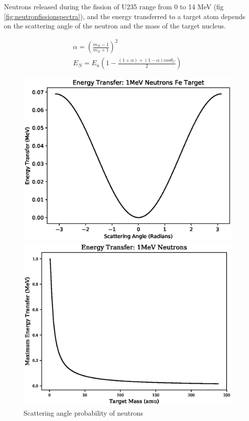 Neutrons released during the fission of U235 range from 0 to 14 MeV (fig \ref{fig:neutronfissionspectra}), and the energy transferred to a target atom depends on the scattering angle of the neutron and the mass of the target nucleus.  

\begin{equation}
\begin{split}
\alpha = (\frac{m_N-1}{m_N+1})^2 \\
E_N = E_n \left(1 - \frac{(1+\alpha) + (1 - \alpha) cos \theta_C}{2}\right)
\end{split}
\label{eq:eqNeutronEnergyTransfer}
\end{equation}

\begin{figure}
\centering
\begin{minipage}{.46\textwidth}
\centering
\includegraphics[width=.9\linewidth]{chapters/austenitic_steels_in_nuclear/plots/scattering_angle.eps}
\caption{Scattering angle probability of neutrons}
\label{fig:scatteringangle}
\end{minipage}
\begin{minipage}{.05\textwidth}
\end{minipage}
\begin{minipage}{.46\textwidth}
\centering
\includegraphics[width=.9\linewidth]{chapters/austenitic_steels_in_nuclear/plots/nuclei_mass.eps}

\end{minipage}
\end{figure}
